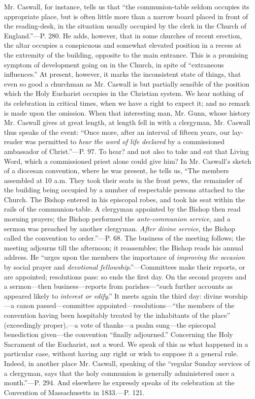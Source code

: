Mr. Caswall, for instance, tells us that ``the
communion-table seldom occupies its appropriate place, but is often
little more than a narrow board placed in front of the reading-desk,
in the situation usually occupied by the clerk in the Church of
England.''—P. 280. He adds, however, that in some churches of recent
erection, the altar occupies a conspicuous and somewhat elevated
position in a recess at the extremity of the building, opposite to the
main entrance. This is a promising symptom of development going
on in the Church, in spite of ``extraneous influences.'' At present,
however, it marks the inconsistent state of things, that even so good
a churchman as Mr. Caswall is but partially sensible of the position
which the Holy Eucharist occupies in the Christian system. We hear
nothing of its celebration in critical times, when we have a right to
expect it; and no remark is made upon the omission. When that
interesting man, Mr. Gunn, whose history Mr. Caswall gives at great
length, at length fell in with a clergyman, Mr. Caswall thus speaks of
the event: ``Once more, after an interval of fifteen years, our
lay-reader was permitted to \emph{hear the word of life declared} by a
commissioned ambassador of Christ.''—P. 97. To hear? and not also to
take and eat that Living Word, which a commissioned priest alone could
give him? In Mr. Caswall's sketch of a diocesan convention, where he
was present, he tells us, ``The members assembled at 10 a.m. They took
their seats in the front pews, the remainder of the building being
occupied by a number of respectable persons attached to the Church.
The Bishop entered in his episcopal robes, and took his seat within
the rails of the communion-table. A clergyman appointed by the Bishop
then read morning prayers; the Bishop performed the \emph{ante-communion
service}, and a sermon was preached by another clergyman. \emph{After
divine service}, the Bishop called the convention to order.''—P.
68. The business of the meeting follows; the meeting adjourns till the
afternoon; it reassembles; the Bishop reads his annual address. He ``urges
upon the members the importance of \emph{improving the occasion} by
social prayer and \emph{devotional fellowship}.''—Committees make
their reports, or are appointed; resolutions pass: so ends the first
day. On the second prayers and a sermon—then business—reports from parishes—``such further accounts as appeared
likely to \emph{interest or edify}.'' It meets again the third day:
divine worship—a canon passed—committee appointed—resolutions—``the
members of the convention having been hospitably treated by the
inhabitants of the place'' (exceedingly proper),—a vote of thanks—a
psalm sung—the episcopal benediction given—the convention ``finally
adjourned.'' Concerning the Holy Sacrament of the Eucharist, not a
word. We speak of this as what happened in a particular case, without
having any right or wish to suppose it a general rule. Indeed, in
another place Mr. Caswall, speaking of the ``regular Sunday services of
a clergyman, says that the holy communion is generally administered
once a month.''—P. 294. And elsewhere he expressly speaks of its
celebration at the Convention of Massachusetts in 1833.—P. 121.

